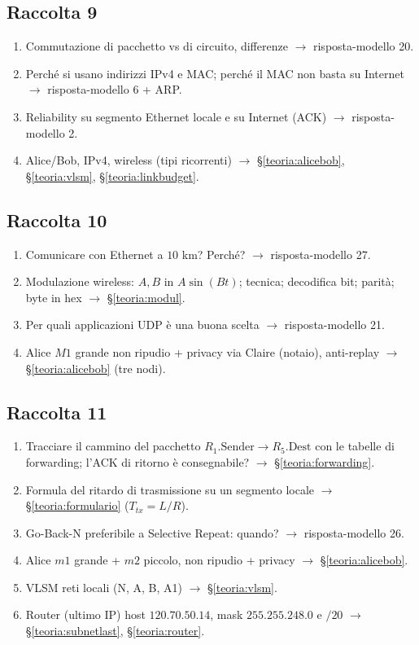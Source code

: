\documentclass[11pt,a4paper]{report}
\begin{document}
\subsection*{Raccolta 9}
\begin{enumerate}[noitemsep]
\item Commutazione di pacchetto vs di circuito, differenze $\to$ risposta-modello 20.
\item Perché si usano indirizzi IPv4 e MAC; perché il MAC non basta su Internet $\to$ risposta-modello 6 + ARP.
\item Reliability su segmento Ethernet locale e su Internet (ACK) $\to$ risposta-modello 2.
\item Alice/Bob, IPv4, wireless (tipi ricorrenti) $\to$ \S\ref{teoria:alicebob}, \S\ref{teoria:vlsm}, \S\ref{teoria:linkbudget}.
\end{enumerate}

\subsection*{Raccolta 10}
\begin{enumerate}[noitemsep]
\item Comunicare con Ethernet a $10$ km? Perché? $\to$ risposta-modello 27.
\item Modulazione wireless: $A,B$ in $A\sin(Bt)$; tecnica; decodifica bit; parità; byte in hex $\to$ \S\ref{teoria:modul}.
\item Per quali applicazioni UDP è una buona scelta $\to$ risposta-modello 21.
\item Alice $M1$ grande non ripudio + privacy via Claire (notaio), anti-replay $\to$ \S\ref{teoria:alicebob} (tre nodi).
\end{enumerate}

\subsection*{Raccolta 11}
\begin{enumerate}[noitemsep]
\item Tracciare il cammino del pacchetto $R_1.\text{Sender}\to R_5.\text{Dest}$ con le tabelle di forwarding; l'ACK di ritorno è consegnabile? $\to$ \S\ref{teoria:forwarding}.
\item Formula del ritardo di trasmissione su un segmento locale $\to$ \S\ref{teoria:formulario} ($T_{tx}=L/R$).
\item Go-Back-N preferibile a Selective Repeat: quando? $\to$ risposta-modello 26.
\item Alice $m1$ grande + $m2$ piccolo, non ripudio + privacy $\to$ \S\ref{teoria:alicebob}.
\item VLSM reti locali (N, A, B, A1) $\to$ \S\ref{teoria:vlsm}.
\item Router (ultimo IP) host $120.70.50.14$, mask $255.255.248.0$ e $/20$ $\to$ \S\ref{teoria:subnetlast}, \S\ref{teoria:router}.
\end{enumerate}
\end{document}
